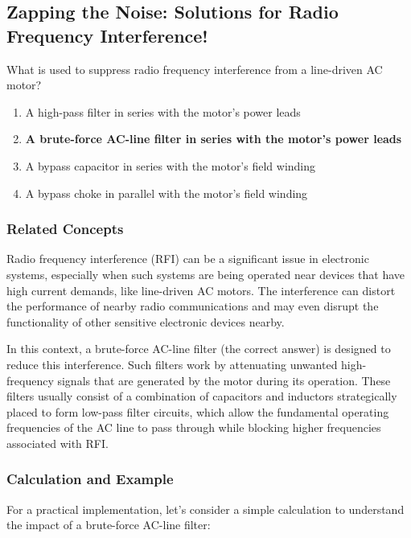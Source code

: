 \subsection{Zapping the Noise: Solutions for Radio Frequency Interference!}

\begin{tcolorbox}[colback=gray!10, colframe=black, title=E4E05`]
What is used to suppress radio frequency interference from a line-driven AC motor? \\
\begin{enumerate}
    \item A high-pass filter in series with the motor’s power leads
    \item \textbf{A brute-force AC-line filter in series with the motor’s power leads}
    \item A bypass capacitor in series with the motor’s field winding
    \item A bypass choke in parallel with the motor’s field winding
\end{enumerate} \end{tcolorbox}

\subsubsection{Related Concepts}

Radio frequency interference (RFI) can be a significant issue in electronic systems, especially when such systems are being operated near devices that have high current demands, like line-driven AC motors. The interference can distort the performance of nearby radio communications and may even disrupt the functionality of other sensitive electronic devices nearby.

In this context, a brute-force AC-line filter (the correct answer) is designed to reduce this interference. Such filters work by attenuating unwanted high-frequency signals that are generated by the motor during its operation. These filters usually consist of a combination of capacitors and inductors strategically placed to form low-pass filter circuits, which allow the fundamental operating frequencies of the AC line to pass through while blocking higher frequencies associated with RFI.

\subsubsection{Calculation and Example}

For a practical implementation, let's consider a simple calculation to understand the impact of a brute-force AC-line filter:

